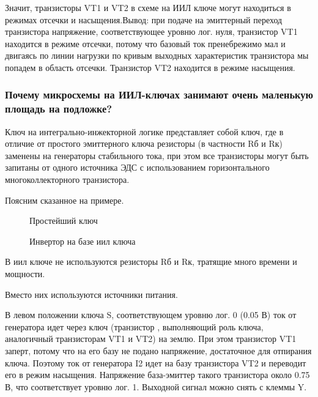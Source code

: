 Значит, транзисторы VT1 и VT2 в схеме на ИИЛ ключе могут находиться в режимах отсечки и насыщения.Вывод: при подаче на эмиттерный переход транзистора напряжение, соответствующее уровню лог. нуля, транзистор VT1 находится в режиме отсечки, потому что базовый ток пренебрежимо мал и двигаясь по линии нагрузки по кривым выходных характеристик транзистора мы попадем в область отсечки. Транзистор VT2 находится в режиме насыщения.

\subsubsection{Почему микросхемы на ИИЛ-ключах занимают очень маленькую площадь на подложке?}

Ключ на интегрально-инжекторной логике представляет собой ключ, где в отличие от простого эмиттерного ключа резисторы (в частности Rб и Rк) заменены на генераторы стабильного тока, при этом все транзисторы могут быть запитаны от одного источника ЭДС с использованием горизонтального многоколлекторного транзистора.

Поясним сказанное на примере.

\begin{center}
	\begin{figure}[h!]
		\caption{Простейший ключ}	
		\label{iil1}
	\end{figure}
\end{center}

 

\begin{center}
	\begin{figure}[h!]
		\caption{Инвертор на базе иил ключа}	
		\label{iil3}
	\end{figure}
\end{center}



В иил ключе не используются резисторы Rб и Rк, тратящие много времени и мощности. 

Вместо них используются источники питания. 

В левом положении ключа S, соответствующем уровню  лог. 0 (0.05 В) ток от генератора идет через ключ (транзистор , выполняющий роль ключа, аналогичный транзисторам VT1 и VT2) на землю. При этом транзистор VT1 заперт, потому что на его базу не подано напряжение, достаточное для отпирания ключа. Поэтому ток от генератора I2 идет на базу транзистора VT2 и переводит его в режим насыщения. Напряжение база-эмиттер такого транзистора около 0.75 В, что соответствует уровню лог. 1. Выходной сигнал можно снять с клеммы Y.

